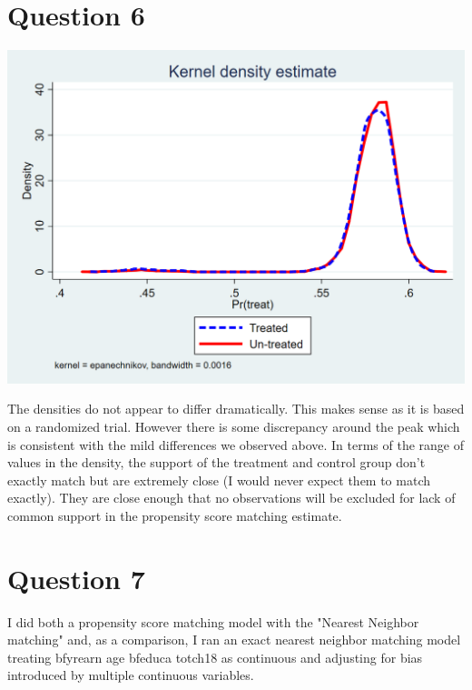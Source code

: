 \documentclass[11pt]{article}
\begin{document}
\section{ Question 6}


	\includegraphics[width=1\linewidth]{6_kdens.png}

The densities do not appear to differ dramatically. This makes sense as it is based on a randomized trial. However there is some discrepancy around the peak which is consistent with the mild differences we observed above. In terms of the range of values in the density, the support of the treatment and control group don't exactly match but are extremely close (I would never expect them to match exactly). They are close enough that no observations will be excluded for lack of common support in the propensity score matching estimate. 


\section{ Question 7}

I did both a propensity score matching model with the "Nearest Neighbor matching" and, as a comparison, I ran an exact nearest neighbor matching model treating bfyrearn age bfeduca totch18 as continuous and adjusting for bias introduced by multiple continuous variables. 

\begin{center}
	
	
	
\end{center}
\end{document}
